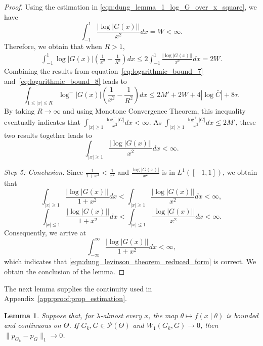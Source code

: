 \documentclass[11pt,twoside]{article} %
\newtheorem{lemma}{Lemma}
\begin{document}
\begin{proof}
Using the estimation in \eqref{eqn:dung_lemma_1_log_G_over_x_square}, we have 
$$\int_{-1}^1 \frac{|\log|G(x)||}{x^2} dx = W < \infty.$$
Therefore, we obtain that when $R > 1$,
\begin{align}
\int_{-1}^1 \log|G(x)| \left(\frac{1}{x^2} - \frac{1}{R^2}\right) dx \le 2\int_{-1}^1 \frac{|\log|G(x)||}{x^2} dx = 2W. \label{eq:logarithmic_bound_8}
\end{align}
Combining the results from equation~\eqref{eq:logarithmic_bound_7} and~\eqref{eq:logarithmic_bound_8} leads to
$$ \int_{1 \le |x| \le R} \log^-|G(x)| \left(\frac{1}{x^2} - \frac{1}{R^2}\right) dx \le 2M' + 2W + 4|\log \bar{C}| + 8\tau.$$
By taking $R \to \infty$ and using Monotone Convergence Theorem, this inequality eventually indicates that
$\int_{|x| \ge 1} \frac{\log^-|G|}{x^2} dx < \infty$. As $\int_{|x| \ge 1} \frac{\log^+|G|}{x^2} dx \leq 2M'$, these two results together leads to
$$\int_{|x| \ge 1} \frac{|\log|G(x)||}{x^2} dx < \infty.$$



\textit{Step 5: Conclusion. } Since $\frac{1}{1+x^2} < \frac{1}{x^2}$ and $\frac{\log|G(x)|}{x^2}$ is in $L^1([-1, 1])$,
we obtain that  
$$\int_{|x| \ge 1} \frac{|\log|G(x)||}{1 + x^2} dx < \int_{|x| \ge 1} \frac{|\log|G(x)||}{x^2} dx < \infty,$$
$$\int_{|x| \leq 1} \frac{|\log|G(x)||}{1 + x^2} dx < \int_{|x| \leq 1} \frac{|\log|G(x)||}{x^2} dx < \infty.$$
Consequently, we arrive at
$$ \int_{-\infty}^\infty \frac{|\log|G(x)||}{1+x^2} dx < \infty,$$
which indicates that \eqref{eqn:dung_levinson_theorem_reduced_form} is correct. We obtain the conclusion of the lemma.
\end{proof}

The next lemma supplies the continuity used in Appendix~\ref{app:proof:prop_estimation}. %

\begin{lemma}\label{lem:mixture_continuity}
Suppose that, for $\lambda$-almost every $x$, the map $\theta\mapsto f(x\mid\theta)$ is bounded and continuous on
$\Theta$. If $G_k,G\in\mathcal P(\Theta)$ and $W_1(G_k,G)\to0$, then $\|p_{G_k}-p_G\|_1\to0$.
\end{lemma}
\end{document}
